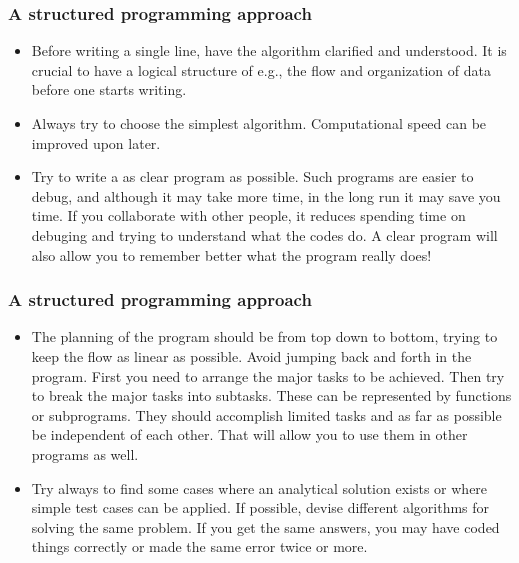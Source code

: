 \documentclass{beamer}
\begin{document}
\begin{frame}
\frametitle{A structured programming approach}

\begin{itemize}
  \item Before writing a single line, have the algorithm clarified and understood. It is crucial to have a logical structure of e.g., the flow and organization of data before one starts writing.

  \item Always try to choose the simplest algorithm. Computational speed can be improved upon later.

  \item Try to write a as clear program as possible. Such programs are easier to debug, and although it may take more time, in the long run it may save you time. If you collaborate with other people, it reduces spending time on debuging and trying to understand what the codes do. A clear program will also allow you to remember better what the program really does!
\end{itemize}

\noindent
\end{frame}

\begin{frame}
\frametitle{A structured programming approach}

\begin{itemize}
  \item The planning of the program should be from top down to bottom, trying to keep the flow as linear as possible. Avoid jumping back and forth in the program. First you need to arrange the major tasks to be achieved. Then try to break the major tasks into subtasks. These can be represented by functions or subprograms. They should accomplish limited tasks and as far as possible be independent of each other. That will allow you to use them in other programs as well.

  \item Try always to find some cases where an analytical solution exists or where simple test cases can be applied. If possible, devise different algorithms for solving the same problem. If you get the same answers, you may have coded things correctly or made the same error twice or more.
\end{itemize}

\noindent
\end{frame}
\end{document}
